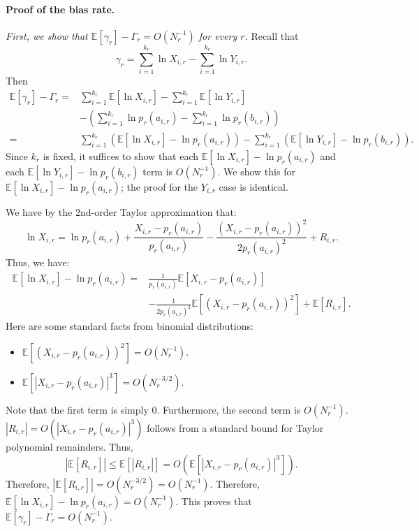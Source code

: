 \documentclass{article}
\begin{document}
\paragraph{Proof of the bias rate.}
\emph{First, we show that
$\mathbb{E}[\gamma_r]-\Gamma_r=O(N_r^{-1})$ for every $r$.}
Recall that
\[
\gamma_r=\sum_{i=1}^{k_r}\ln X_{i,r}
-\sum_{i=1}^{k_r}\ln Y_{i,r}.
\]
Then
\begin{align*}
\mathbb{E}[\gamma_r]-\Gamma_r
={}&\sum_{i=1}^{k_r}\mathbb{E}[\ln X_{i,r}]
-\sum_{i=1}^{k_r}\mathbb{E}[\ln Y_{i,r}]\\
&-\left(\sum_{i=1}^{k_r}\ln p_r(a_{i,r})
-\sum_{i=1}^{k_r}\ln p_r(b_{i,r})\right)\\
={}&\sum_{i=1}^{k_r}
\left(\mathbb{E}[\ln X_{i,r}]-\ln p_r(a_{i,r})\right)
-\sum_{i=1}^{k_r}
\left(\mathbb{E}[\ln Y_{i,r}]-\ln p_r(b_{i,r})\right).
\end{align*}
Since $k_r$ is fixed, it suffices to show that each
$\mathbb{E}[\ln X_{i,r}]-\ln p_r(a_{i,r})$ and each
$\mathbb{E}[\ln Y_{i,r}]-\ln p_r(b_{i,r})$ term is $O(N_r^{-1})$. We show
this for $\mathbb{E}[\ln X_{i,r}]-\ln p_r(a_{i,r})$; the proof for the
$Y_{i,r}$ case is identical.

We have by the 2nd-order Taylor approximation that:
\[
\ln X_{i,r}=\ln p_r(a_{i,r})
+\frac{X_{i,r}-p_r(a_{i,r})}{p_r(a_{i,r})}
-\frac{(X_{i,r}-p_r(a_{i,r}))^2}{2p_r(a_{i,r})^2}+R_{i,r}.
\]
Thus, we have:
\begin{align*}
\mathbb{E}[\ln X_{i,r}]-\ln p_r(a_{i,r})
={}&\frac{1}{p_r(a_{i,r})}
\mathbb{E}[X_{i,r}-p_r(a_{i,r})]\\
&-\frac{1}{2p_r(a_{i,r})^2}
\mathbb{E}[(X_{i,r}-p_r(a_{i,r}))^2]
+\mathbb{E}[R_{i,r}].
\end{align*}
Here are some standard facts from binomial distributions:
\begin{itemize}
    \item $\mathbb{E}[(X_{i,r}-p_r(a_{i,r}))^2]=O(N_r^{-1})$.
    \item $\mathbb{E}[|X_{i,r}-p_r(a_{i,r})|^3]=O(N_r^{-3/2})$.
\end{itemize}
Note that the first term is simply $0$. Furthermore, the second term is
$O(N_r^{-1})$.
$|R_{i,r}|=O(|X_{i,r}-p_r(a_{i,r})|^3)$ follows from a standard bound for
Taylor polynomial remainders. Thus,
\[
|\mathbb{E}[R_{i,r}]|
\leq\mathbb{E}[|R_{i,r}|]
=O\!\left(\mathbb{E}[|X_{i,r}-p_r(a_{i,r})|^3]\right).
\]
Therefore, $|\mathbb{E}[R_{i,r}]|=O(N_r^{-3/2})=O(N_r^{-1})$. Therefore,
$\mathbb{E}[\ln X_{i,r}]-\ln p_r(a_{i,r})=O(N_r^{-1})$.
This proves that $\mathbb{E}[\gamma_r]-\Gamma_r=O(N_r^{-1})$.
\end{document}
